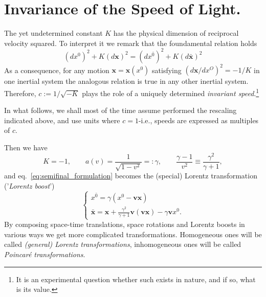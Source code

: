 \section{Invariance of the Speed of Light.}
The yet undetermined constant $ K $ has the physical dimension of reciprocal velocity squared. To interpret it we remark that the foundamental relation holds
\[(dx^0)^2+K(d\mathbf{x})^2=(dx^{\bar{0}})^2+K(d\mathbf{\bar{x}})^2 \]
As a consequence, for any motion $ \mathbf{x}=\mathbf{x}(x^0) $ satisfying $ (d\mathbf{x}/dx^O)^2=-1/K $ in one inertial system the analogous relation is true in any other inertial system. Therefore, $ c:= 1/\sqrt{-K} $ plays the role of a uniquely determined \emph{invariant speed}.\footnote{It is an experimental question whether such exists in nature, and if so, what is its value.}

In what follows, we shall most of the time assume performed the rescaling indicated above, and use units where $ c = 1 $-i.e., speeds are expressed as multiples of $ c $.

Then we have
\begin{equation}
K=-1,\qquad a(v)=\frac{1}{\sqrt{1-v^2}}=:\gamma,\qquad \frac{\gamma-1}{v^2}\equiv \frac{\gamma^2}{\gamma+1},
\end{equation}
and eq.~\eqref{eq:semifinal_formulation} becomes the (special) Lorentz transformation ('\emph{Lorentz boost}')
\begin{equation}
\begin{cases}
x^{\bar{0}}=\gamma(x^0-\mathbf{v}\mathbf{x})\\
\bar{\mathbf{x}}=\mathbf{x}+\frac{\gamma^2}{\gamma+1}\mathbf{v}(\mathbf{v}\mathbf{x})-\gamma\mathbf{v}x^0.
\end{cases}
\end{equation}
By composing space-time translations, space rotations and Lorentz boosts in various ways we get more complicated transformations. Homogeneous ones will be called \emph{(general) Lorentz transformations}, inhomogeneous ones will be called \emph{Poincar\'e transformations}.







